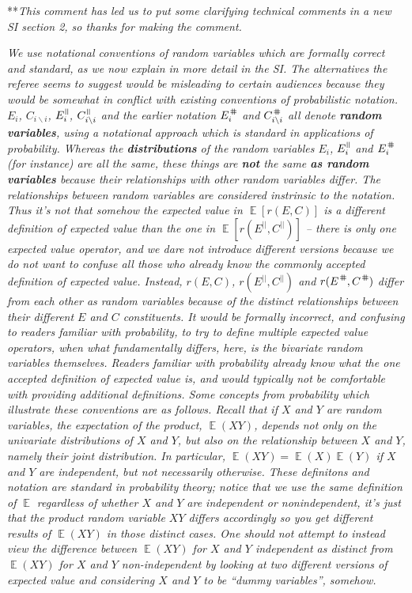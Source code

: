 \documentclass[letterpaper,11pt]{article}
\DeclareMathOperator{\E}{\mathbb{E}}%
\newcommand{\nat}{%
\text{\hspace{-1.5pt}
\begin{tikzpicture}[scale=1.8]%
\draw (.333ex,0) -- (.333ex,1ex);%
\draw (.666ex,0) -- (.666ex,1ex);
\end{tikzpicture}%
}}
\newcommand{\shp}{%
\text{\hspace{-1.5pt}
\begin{tikzpicture}[scale=1.8]%
\draw (0,.333ex) -- (1ex,.333ex);%
\draw (0,.666ex) -- (1ex,.666ex);%
\draw (.333ex,0) -- (.333ex,1ex);%
\draw (.666ex,0) -- (.666ex,1ex);
\end{tikzpicture}%
}}
\newcommand{\bs}{\backslash}
\begin{document}
\noindent ***\emph{This comment has led us to put some clarifying technical comments in a new SI section 2,
so thanks for making the comment.} 

\emph{We use notational conventions of random variables which are formally correct and standard, 
as we now explain in more detail in the SI. The alternatives the referee seems to suggest would be misleading to certain audiences 
because they would be somewhat in conflict with existing conventions of probabilistic notation.
$E_i$, $C_{i \bs i}$, $E_i^{\nat}$, $C_{i \bs i}^\nat$ and the earlier 
notation $E_i^\shp$ and $C_{i \bs i}^\shp$ all denote \textbf{random variables}, using a 
notational approach which is standard in applications of probability. 
Whereas the \textbf{distributions} of the random variables $E_i$, $E_i^{\nat}$ and $E_i^\shp$ (for instance) are all the same,
these things are \textbf{not} the same \textbf{as random variables} because their relationships with other random variables 
differ. The relationships between random variables are considered instrinsic
to the notation. Thus it's not that somehow the expected value in $\E[r(E,C)]$ is a different definition of expected
value than the one in $\E[r(E^{||},C^{||})]$ -- there is only one expected value operator, and we dare not 
introduce different versions because we do not want to confuse all those who already know the commonly
accepted definition of expected value. 
Instead, $r(E,C)$, $r(E^{||},C^{||})$ and $r(E^\shp,C^\shp)$ differ from each other 
as random variables because of the distinct relationships between their
different $E$ and $C$ constituents. It would be formally 
incorrect, and confusing to readers familiar with probability, to try to define multiple expected value 
operators, when what fundamentally differs, here, is the bivariate random variables 
themselves. Readers familiar with
probability already know what the one accepted definition of expected value is, and would typically
not be comfortable with providing additional definitions. Some concepts from probability
which illustrate these conventions are as follows. Recall that if $X$ and $Y$ are random variables, the expectation of the 
product, $\E(XY)$, depends not only on the univariate distributions of $X$ and $Y$, but also on the relationship
between $X$ and $Y$, namely their joint distribution. In particular, $\E(XY)=\E(X)\E(Y)$ if $X$ and 
$Y$ are independent, but not necessarily otherwise. These definitons and notation are 
standard in probability theory; notice that we use the same definition of $\E$ regardless of 
whether $X$ and $Y$ are independent or nonindependent, it's just that the product random variable
$XY$ differs accordingly so you get different results of $\E(XY)$ in those distinct cases.
One should not attempt to instead view the difference between $\E(XY)$ for $X$ and $Y$ independent
as distinct from $\E(XY)$ for $X$ and $Y$ non-independent by looking at two different versions
of expected value and considering $X$ and $Y$ to be ``dummy variables'', somehow.}
\end{document}

